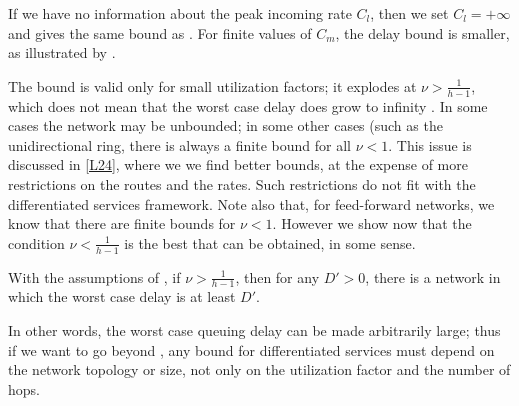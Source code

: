 If we have no information about the peak incoming rate $C_l$, then
we set $C_l = + \infty$ and  gives the
same bound as . For finite values of
$C_m$, the delay bound is smaller, as illustrated by
.
\begin{figure}[!htbp]
\end{figure}

The bound is valid only for small utilization factors; it explodes
at $\nu > \frac{1}{h-1}$, which does not mean that the worst case
delay does grow to infinity \cite{LeBoudec2000mMay}. In some cases
the network may be unbounded; in some other cases (such as the
unidirectional ring, there is always a finite bound for all $\nu
<1$. This issue is discussed in \cref{L24}, where we we find
better bounds, at the expense of more restrictions on the routes
and the rates. Such restrictions do not fit with the
differentiated services framework. Note also that, for
feed-forward networks, we know that there are finite bounds for
$\nu <1$. However we show now that the condition $\nu <
\frac{1}{h-1}$ is the best that can be obtained, in some sense.
%
\begin{proposition}\cite{lebinfocom2001, qofis2000}
With the assumptions of , if $\nu >
\frac{1}{h-1}$, then for any $D' >0$, there is a network in which
the worst case delay is at least $D'$. 
\end{proposition}
In other words, the worst case queuing delay can be made
arbitrarily large; thus if we want to go beyond
, any bound for differentiated services
must depend on the network topology or size, not only on the
utilization factor and the number of hops.

